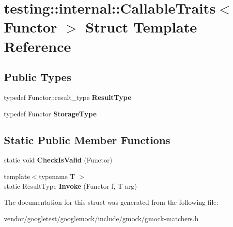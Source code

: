 \hypertarget{structtesting_1_1internal_1_1CallableTraits}{}\section{testing\+:\+:internal\+:\+:Callable\+Traits$<$ Functor $>$ Struct Template Reference}
\label{structtesting_1_1internal_1_1CallableTraits}
\subsection*{Public Types}
\begin{DoxyCompactItemize}
\item 
typedef Functor\+::result\+\_\+type {\bfseries Result\+Type}\hypertarget{structtesting_1_1internal_1_1CallableTraits_a242d198dd1c56a153ba931d7166ec7f3}{}\label{structtesting_1_1internal_1_1CallableTraits_a242d198dd1c56a153ba931d7166ec7f3}

\item 
typedef Functor {\bfseries Storage\+Type}\hypertarget{structtesting_1_1internal_1_1CallableTraits_a23cc0c86a3bd18b2f8dd159dd44e1168}{}\label{structtesting_1_1internal_1_1CallableTraits_a23cc0c86a3bd18b2f8dd159dd44e1168}

\end{DoxyCompactItemize}
\subsection*{Static Public Member Functions}
\begin{DoxyCompactItemize}
\item 
static void {\bfseries Check\+Is\+Valid} (Functor)\hypertarget{structtesting_1_1internal_1_1CallableTraits_ab09a6487235947ec9c5d933d07ac605b}{}\label{structtesting_1_1internal_1_1CallableTraits_ab09a6487235947ec9c5d933d07ac605b}

\item 
{\footnotesize template$<$typename T $>$ }\\static Result\+Type {\bfseries Invoke} (Functor f, T arg)\hypertarget{structtesting_1_1internal_1_1CallableTraits_ad54471cad61aefbe15de330867ff5936}{}\label{structtesting_1_1internal_1_1CallableTraits_ad54471cad61aefbe15de330867ff5936}

\end{DoxyCompactItemize}


The documentation for this struct was generated from the following file\+:\begin{DoxyCompactItemize}
\item 
vendor/googletest/googlemock/include/gmock/gmock-\/matchers.\+h\end{DoxyCompactItemize}
